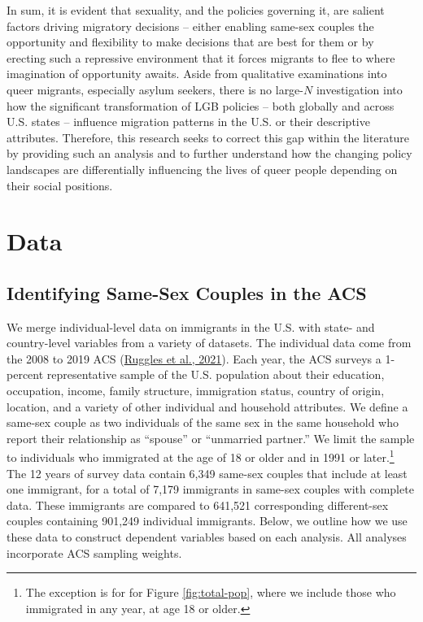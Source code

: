 \documentclass[
  11pt,
]{article}
\begin{document}
In sum, it is evident that sexuality, and the policies governing it, are salient factors driving migratory decisions -- either enabling same-sex couples the opportunity and flexibility to make decisions that are best for them or by erecting such a repressive environment that it forces migrants to flee to where imagination of opportunity awaits. Aside from qualitative examinations into queer migrants, especially asylum seekers, there is no large-\(N\) investigation into how the significant transformation of LGB policies -- both globally and across U.S. states -- influence migration patterns in the U.S. or their descriptive attributes. Therefore, this research seeks to correct this gap within the literature by providing such an analysis and to further understand how the changing policy landscapes are differentially influencing the lives of queer people depending on their social positions.

\hypertarget{data}{%
\section{Data}\label{data}}

\hypertarget{identifying-same-sex-couples-in-the-acs}{%
\subsection{Identifying Same-Sex Couples in the ACS}\label{identifying-same-sex-couples-in-the-acs}}

We merge individual-level data on immigrants in the U.S. with state- and country-level variables from a variety of datasets. The individual data come from the 2008 to 2019 ACS (\protect\hyperlink{ref-ruggles_2021}{Ruggles et al., 2021}). Each year, the ACS surveys a 1-percent representative sample of the U.S. population about their education, occupation, income, family structure, immigration status, country of origin, location, and a variety of other individual and household attributes. We define a same-sex couple as two individuals of the same sex in the same household who report their relationship as ``spouse'' or ``unmarried partner.'' We limit the sample to individuals who immigrated at the age of 18 or older and in 1991 or later.\footnote{The exception is for for Figure \ref{fig:total-pop}, where we include those who immigrated in any year, at age 18 or older.} The 12 years of survey data contain 6,349 same-sex couples that include at least one immigrant, for a total of 7,179 immigrants in same-sex couples with complete data. These immigrants are compared to 641,521 corresponding different-sex couples containing 901,249 individual immigrants. Below, we outline how we use these data to construct dependent variables based on each analysis. All analyses incorporate ACS sampling weights.
\end{document}
